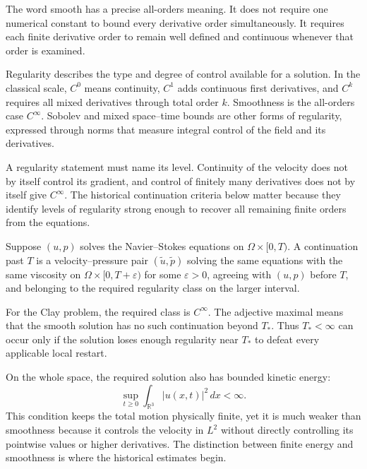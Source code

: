 The word smooth has a precise all-orders meaning.
It does not require one numerical constant to bound every derivative order simultaneously.
It requires each finite derivative order to remain well defined and continuous whenever that order is examined.


\begin{definition}[Regularity]\label{def:Regularity}
Regularity describes the type and degree of control available for a solution.
In the classical scale, \(C^0\) means continuity, \(C^1\) adds continuous first derivatives, and \(C^k\) requires all mixed derivatives through total order \(k\).
Smoothness is the all-orders case \(C^\infty\).
Sobolev and mixed space--time bounds are other forms of regularity, expressed through norms that measure integral control of the field and its derivatives.
\end{definition}

A regularity statement must name its level.
Continuity of the velocity does not by itself control its gradient, and control of finitely many derivatives does not by itself give \(C^\infty\).
The historical continuation criteria below matter because they identify levels of regularity strong enough to recover all remaining finite orders from the equations.


\begin{definition}[Continuation]\label{def:Continuation}
Suppose \((u,p)\) solves the Navier--Stokes equations on \(\Omega\times[0,T)\).
A continuation past \(T\) is a velocity--pressure pair \((\widetilde u,\widetilde p)\) solving the same equations with the same viscosity on \(\Omega\times[0,T+\varepsilon)\) for some \(\varepsilon>0\), agreeing with \((u,p)\) before \(T\), and belonging to the required regularity class on the larger interval.
\end{definition}

For the Clay problem, the required class is \(C^\infty\).
The adjective maximal means that the smooth solution has no such continuation beyond \(T_*\).
Thus \(T_*<\infty\) can occur only if the solution loses enough regularity near \(T_*\) to defeat every applicable local restart.


On the whole space, the required solution also has bounded kinetic energy:
\[
  \sup_{t\geq0}
  \int_{\mathbb R^3}|u(x,t)|^2\,dx
  <
  \infty.
\]
This condition keeps the total motion physically finite, yet it is much weaker than smoothness because it controls the velocity in \(L^2\) without directly controlling its pointwise values or higher derivatives.
The distinction between finite energy and smoothness is where the historical estimates begin.

